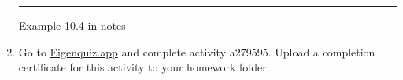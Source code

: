 \documentclass[12pt]{amsart}
\newcommand{\1}{\mathbbm{1}}
\numberwithin{equation}{section}
\numberwithin{Theorem}{section}
\theoremstyle{plain} %
\theoremstyle{definition}
\theoremstyle{remark}
\begin{document}
\begin{enumerate}[1.]
\hrule
\bigskip

Example 10.4 in notes



\vspace{\fill}

\item Go to \href{https://eigenquiz.app/}{Eigenquiz.app} and complete activity a279595. Upload a completion certificate for this activity to your homework folder.

\end{enumerate}
\end{document}
